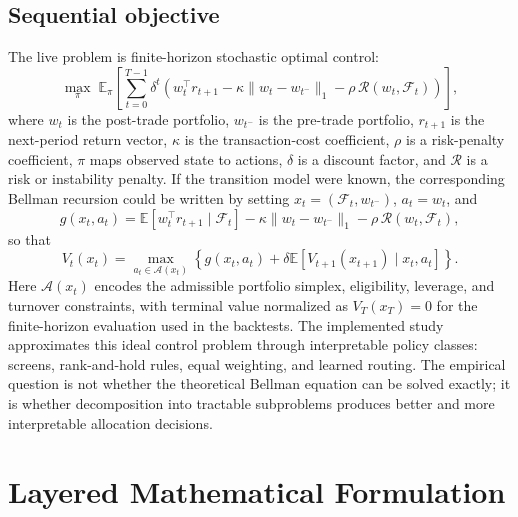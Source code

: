 \documentclass[11pt,a4paper]{article}
\newcommand{\E}{\mathbb{E}}
\begin{document}
\subsection{Sequential objective}
The live problem is finite-horizon stochastic optimal control:
\begin{equation}
\max_{\pi}\; \E_\pi\left[\sum_{t=0}^{T-1}\delta^t\left(w_t^\top r_{t+1}-\kappa\lVert w_t-w_{t^-}\rVert_1-\rho\,\mathcal{R}(w_t,\mathcal{F}_t)\right)\right],
\label{eq:sequential_objective}
\end{equation}
where $w_t$ is the post-trade portfolio, $w_{t^-}$ is the pre-trade portfolio, $r_{t+1}$ is the next-period return vector, $\kappa$ is the transaction-cost coefficient, $\rho$ is a risk-penalty coefficient, $\pi$ maps observed state to actions, $\delta$ is a discount factor, and $\mathcal{R}$ is a risk or instability penalty. If the transition model were known, the corresponding Bellman recursion could be written by setting $x_t=(\mathcal{F}_t,w_{t^-})$, $a_t=w_t$, and
\begin{equation}
g(x_t,a_t)=\E\!\left[w_t^\top r_{t+1}\mid\mathcal{F}_t\right]-\kappa\lVert w_t-w_{t^-}\rVert_1-\rho\,\mathcal{R}(w_t,\mathcal{F}_t),
\end{equation}
so that
\begin{equation}
V_t(x_t)=\max_{a_t\in\mathcal{A}(x_t)}\left\{g(x_t,a_t)+\delta\E[V_{t+1}(x_{t+1})\mid x_t,a_t]\right\}.
\end{equation}
Here $\mathcal{A}(x_t)$ encodes the admissible portfolio simplex, eligibility, leverage, and turnover constraints, with terminal value normalized as $V_T(x_T)=0$ for the finite-horizon evaluation used in the backtests.
The implemented study approximates this ideal control problem through interpretable policy classes: screens, rank-and-hold rules, equal weighting, and learned routing. The empirical question is not whether the theoretical Bellman equation can be solved exactly; it is whether decomposition into tractable subproblems produces better and more interpretable allocation decisions.

\section{Layered Mathematical Formulation}
\end{document}
